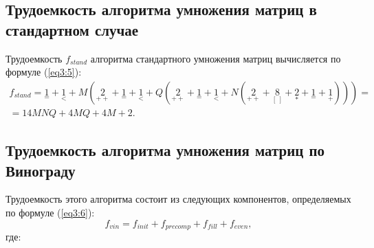 \subsection{Трудоемкость алгоритма умножения матриц в стандартном случае}
Трудоемкость $f_{stand}$ алгоритма стандартного умножения матриц вычисляется по формуле (\ref{eq3:5}):
\begin{multline}
	\label{eq3:5}
	f_{stand} = {\underset{=}{1}} + {\underset{<}{1}} + M({\underset{++}{2}} + {\underset{=}{1}} + {\underset{<}{1}} + Q({\underset{++}{2}} + {\underset{=}{1}} + {\underset{<}{1}} + N({\underset{++}{2}} + {\underset{[\ ]}{8}} + {\underset{*}{2}} + {\underset{=}{1}} + {\underset{+}{1}}))) = \\
	= 14MNQ + 4MQ + 4M + 2.
\end{multline}

\subsection{Трудоемкость алгоритма умножения матриц по Винограду}
Трудоемкость этого алгоритма состоит из следующих компонентов, определяемых по формуле (\ref{eq3:6}):
\begin{equation}
	\label{eq3:6}
	f_{vin} = f_{init} + f_{precomp} + f_{fill} + f_{even},
\end{equation}
где:
